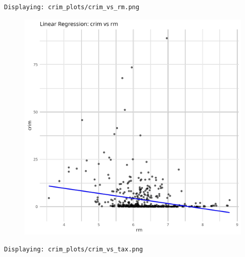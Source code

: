 \documentclass[
]{article}
\begin{document}
\begin{verbatim}
Displaying: crim_plots/crim_vs_rm.png 
\end{verbatim}

\begin{figure}[H]

{\centering \includegraphics{hw1_files/figure-pdf/unnamed-chunk-16-10.pdf}

}

\end{figure}

\begin{verbatim}
Displaying: crim_plots/crim_vs_tax.png 
\end{verbatim}
\end{document}
